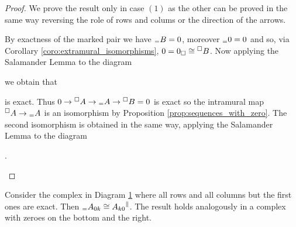\begin{proof}
  We prove the result only in case \((1)\) as the other can be proved in the same way reversing the role of rows and colums or the direction of the arrows.

  By exactness of the marked pair we have \({}_={B} = 0\), moreover \({}_={0}=0\) and so, via Corollary \ref{coro:extramural_isomorphisms}, \(0 = {0}_{\Box} \cong {}^{\Box}{B}\). Now applying the Salamander Lemma to the diagram
  \begin{center}
  \end{center}
  we obtain that
  \begin{center}
  \end{center}
  is exact. Thus \(0\to{}^{\Box}{A}\to{}_={A}\to{}^{\Box}{B} = 0\) is exact so the intramural map \({}^{\Box}{A}\to{}_={A}\) is an isomorphism by Proposition \ref{prop:sequences_with_zero}. The second isomorphism is obtained in the same way, applying the Salamander Lemma to the diagram
  \begin{center}
    .
  \end{center}
\end{proof}

\begin{lemma}
  \label{lemma:nn}
  Consider the complex in Diagram \ref{diagram:nn} where all rows and all columns but the first ones are exact. Then \({}_={A_{0k}}\cong{A_{k0}}^{\parallel}\). The result holds analogously in a complex with zeroes on the bottom and the right.
\end{lemma}

\begin{figure}[h]
  \begin{center}
  \end{center}
  \caption{}
  \label{diagram:nn}
\end{figure}

